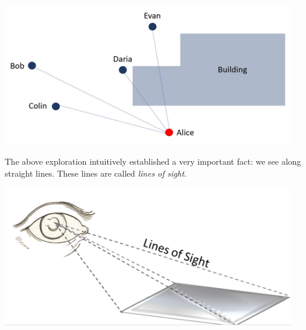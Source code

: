 \documentclass{ximera}
\begin{document}
\begin{exploration}
\begin{foldable}
    \begin{image}
         \includegraphics[width=5in]{hideAndSeek2.jpg}
\end{image}
\end{foldable}
\end{exploration}

The above exploration intuitively established a very important fact: we see along straight lines.  These lines are called \emph{lines of sight}.
\begin{image}
         \includegraphics[width=5in]{linesOfSight.jpg}
\end{image}
\end{document}
